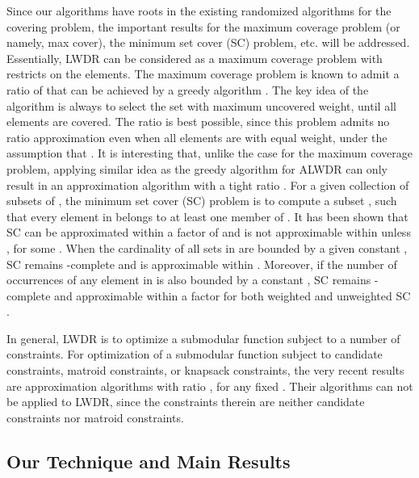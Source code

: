 \documentclass[11pt,english,onecolumn,draftcls]{IEEEtran}
\theoremstyle{plain}
\theoremstyle{plain}
\theoremstyle{plain}
\theoremstyle{plain}
\begin{document}
Since our algorithms have roots in the existing randomized algorithms
for the covering problem, the important results for the maximum coverage
problem (or namely, max cover), the minimum set cover (SC) problem,
etc. will be addressed. Essentially, LWDR can be considered as a maximum
coverage problem with restricts on the elements. The maximum coverage
problem is known to admit a ratio of  that can be
achieved by a greedy algorithm \cite{hochbaum1996approximating}.
The key idea of the algorithm is always to select the set with maximum
uncovered weight, until all elements are covered. The ratio is best
possible, since this problem admits no ratio 
approximation even when all elements are with equal weight, under
the assumption that  \cite{feige1998threshold}.
It is interesting that, unlike the case for the maximum coverage problem,
applying similar idea as the greedy algorithm for ALWDR
can only result in an approximation algorithm with a tight ratio .
For a given collection  of subsets of ,
the minimum set cover (SC) problem is to compute a subset ,
such that every element in  belongs to at least one member of
. It has been shown that SC can be approximated within
a factor of  \cite{johnson1973approximation}
and is not approximable within  unless ,
for some  \cite{feige1998threshold}. When the cardinality of
all sets in  are bounded by a given constant , SC remains
-complete and is approximable within 
\cite{duh1997approximation}. Moreover, if the number of occurrences
of any element in  is also bounded by a constant ,
SC remains -complete \cite{papadimitriou1988optimization}
and approximable within a factor  for both weighted and unweighted
SC \cite{bar1981linear,hochbaum1982approximation}.

In general, LWDR is to optimize a submodular function subject to a
number of constraints. For optimization of a submodular function subject
to candidate constraints, matroid constraints, or knapsack constraints,
the very recent results are approximation algorithms with ratio ,
for any fixed  \cite{DBLP:conf/soda/BadanidiyuruV14}.
Their algorithms can not be applied to LWDR, since the constraints
therein are neither candidate constraints nor matroid constraints.


\subsection{Our Technique and Main Results}
\end{document}
